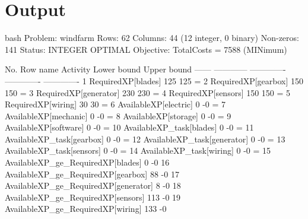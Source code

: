 \section{Output}
    \vspace{2pt}
    \begin{boxminted}{bash}
        Problem:    windfarm
        Rows:       62
        Columns:    44 (12 integer, 0 binary)
        Non-zeros:  141
        Status:     INTEGER OPTIMAL
        Objective:  TotalCosts = 7588 (MINimum)
        
           No.   Row name        Activity     Lower bound   Upper bound
        ------ ------------    ------------- ------------- -------------
             1 RequiredXP[blades]
                                         125           125             = 
             2 RequiredXP[gearbox]
                                         150           150             = 
             3 RequiredXP[generator]
                                         230           230             = 
             4 RequiredXP[sensors]
                                         150           150             = 
             5 RequiredXP[wiring]
                                          30            30             = 
             6 AvailableXP[electric]
                                           0            -0             = 
             7 AvailableXP[mechanic]
                                           0            -0             = 
             8 AvailableXP[storage]
                                           0            -0             = 
             9 AvailableXP[software]
                                           0            -0             = 
            10 AvailableXP_task[blades]
                                           0            -0             = 
            11 AvailableXP_task[gearbox]
                                           0            -0             = 
            12 AvailableXP_task[generator]
                                           0            -0             = 
            13 AvailableXP_task[sensors]
                                           0            -0             = 
            14 AvailableXP_task[wiring]
                                           0            -0             = 
            15 AvailableXP_ge_RequiredXP[blades]
                                           0            -0               
            16 AvailableXP_ge_RequiredXP[gearbox]
                                          88            -0               
            17 AvailableXP_ge_RequiredXP[generator]
                                           8            -0               
            18 AvailableXP_ge_RequiredXP[sensors]
                                         113            -0               
            19 AvailableXP_ge_RequiredXP[wiring]
                                         133            -0               
    \end{boxminted}
